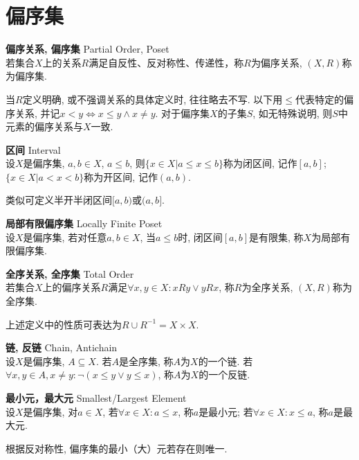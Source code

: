 \section{偏序集}

\begin{dfn} \textbf{偏序关系, 偏序集} Partial Order, Poset\\
若集合$X$上的关系$R$满足自反性、反对称性、传递性，称$R$为偏序关系, $(X,R)$称为偏序集. 
\end{dfn}
\par 当$R$定义明确, 或不强调关系的具体定义时, 往往略去不写. 以下用$\le$代表特定的偏序关系, 并记$x<y\iff x\le y\land x\neq y$. 对于偏序集$X$的子集$S$, 如无特殊说明, 则$S$中元素的偏序关系与$X$一致. 

\begin{dfn} \textbf{区间} Interval\\
设$X$是偏序集, $a,b\in X$, $a\le b$, 则$\{x\in X\vert a\le x\le b\}$称为闭区间, 记作$[a,b]$;  $\{x\in X\vert a<x<b\}$称为开区间, 记作$(a,b)$. 
\end{dfn}
类似可定义半开半闭区间$[a,b)$或$(a,b]$. 

\begin{dfn} \textbf{局部有限偏序集} Locally Finite Poset\\
设$X$是偏序集, 若对任意$a,b\in X$, 当$a\le b$时, 闭区间$[a,b]$是有限集, 称$X$为局部有限偏序集. 
\end{dfn}

\begin{dfn} \textbf{全序关系, 全序集} Total Order\\
若集合$X$上的偏序关系$R$满足$\forall x,y\in X: xRy \lor yRx$, 称$R$为全序关系, $(X,R)$称为全序集. 
\end{dfn}
上述定义中的性质可表达为$R\cup R^{-1}=X\times X$.

\begin{dfn} \textbf{链, 反链} Chain, Antichain\\
设$X$是偏序集, $A\subseteq X$. 若$A$是全序集, 称$A$为$X$的一个链. 若$\forall x,y\in A, x\neq y: \lnot (x\le y \lor y\le x)$, 称$A$为$X$的一个反链. 
\end{dfn}


\begin{dfn} \textbf{最小元，最大元} Smallest/Largest Element\\
设$X$是偏序集, 对$a\in X$, 若$\forall x\in X: a\le x$, 称$a$是最小元; 若$\forall x\in X: x\le a$, 称$a$是最大元. 
\end{dfn}
根据反对称性, 偏序集的最小（大）元若存在则唯一. 


